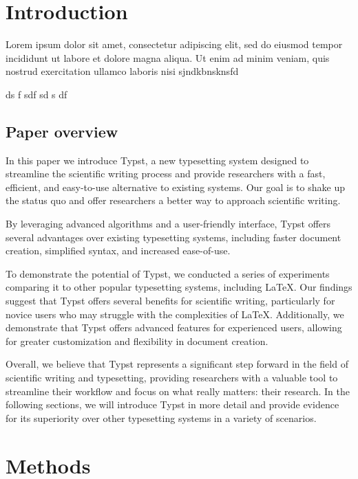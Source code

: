 \section{Introduction}\label{introduction}

Lorem ipsum dolor sit amet, consectetur adipiscing elit, sed do eiusmod
tempor incididunt ut labore et dolore magna aliqua. Ut enim ad minim
veniam, quis nostrud exercitation ullamco laboris nisi sjndkbnsknsfd

ds f sdf sd s df

\subsection{Paper overview}\label{paper-overview}

In this paper we introduce Typst, a new typesetting system designed to
streamline the scientific writing process and provide researchers with a
fast, efficient, and easy-to-use alternative to existing systems. Our
goal is to shake up the status quo and offer researchers a better way to
approach scientific writing.

By leveraging advanced algorithms and a user-friendly interface, Typst
offers several advantages over existing typesetting systems, including
faster document creation, simplified syntax, and increased ease-of-use.

To demonstrate the potential of Typst, we conducted a series of
experiments comparing it to other popular typesetting systems, including
LaTeX. Our findings suggest that Typst offers several benefits for
scientific writing, particularly for novice users who may struggle with
the complexities of LaTeX. Additionally, we demonstrate that Typst
offers advanced features for experienced users, allowing for greater
customization and flexibility in document creation.

Overall, we believe that Typst represents a significant step forward in
the field of scientific writing and typesetting, providing researchers
with a valuable tool to streamline their workflow and focus on what
really matters: their research. In the following sections, we will
introduce Typst in more detail and provide evidence for its superiority
over other typesetting systems in a variety of scenarios.

\section{Methods}\label{methods}

